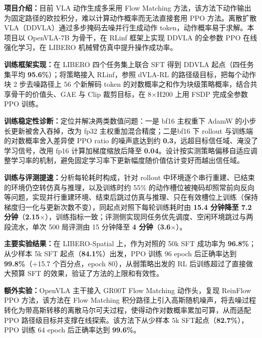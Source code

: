 
\textbf{项目介绍：}目前 VLA 动作生成多采用 Flow Matching 方法，该方法下动作输出为固定路径的欧拉积分，难以计算动作概率而无法直接套用 PPO 方法。离散扩散 VLA（DDVLA）通过多步掩码去噪并行生成动作 token，动作概率易于求解。本项目以 OpenVLA-7B 为骨干，在 RLinf 框架上实现 DDVLA 的全参数 PPO 在线强化学习，在 LIBERO 机械臂仿真中提升操作成功率。\par
\begin{experienceitems}
  \item \textbf{训练框架实现：}在 LIBERO 四个任务集上联合 SFT 得到 DDVLA 起点（四任务集平均 \textbf{95.6\%}）；将策略接入 RLinf，参照 dVLA-RL 的路径级目标，把每个动作块 2 步去噪路径上 56 个新解码 token 的对数概率之和作为块级策略概率，结合共享骨干的价值头、GAE 与 Clip 裁剪目标，在 8$\times$H200 上用 FSDP 完成全参数 PPO 训练。
  \item \textbf{训练稳定性诊断：}定位并解决两类数值问题：一是 bf16 主权重下 AdamW 的小步长更新被舍入吞掉，改为 fp32 主权重加混合精度；二是bf16 下 rollout 与训练端的对数概率舍入差异使 PPO ratio 的噪声底达到约 \textbf{0.3}，远超目标信任域、淹没了学习信号，改用 fp16 计算加梯度缩放后降至 \textbf{0.04}。设计按实测策略偏移自适应调整学习率的机制，避免固定学习率下更新幅度随价值估计变好而越出信任域。
  \item \textbf{训练与评测提速：}分析每轮耗时构成，针对 rollout 中环境逐个串行重建、已结束的环境仍空转仿真与推理，以及训练时约 55\% 的动作槽位被掩码却照常前向反向等问题，实现并行重建环境、结束后跳过仿真与推理、只在有效槽位上训练（保持梯度归一化与更新次数不变），同起点对照下每轮训练耗时由 \textbf{15.4 分钟降至 7.2 分钟}（\textbf{2.15$\times$}），训练指标一致；评测侧实现同任务优先调度、空闲环境跳过与两段流水，单次 500 局评测由 15 分钟降至 \textbf{4 分钟}（\textbf{3.6$\times$}）。
  \item \textbf{主要实验结果：}在 LIBERO-Spatial 上，作为对照的 50k SFT 成功率为 \textbf{96.8\%}；从少样本 5k SFT 起点（\textbf{84.1\%}）出发，PPO 训练 96 epoch 后正确率达到 \textbf{99.8\%}（+15.7 个百分点，epoch 80），从弱策略出发的 RL 后训练超过了直接做大预算 SFT 的效果，验证了方法的上限和有效性。
  \item \textbf{额外实验：}OpenVLA 主干接入 GR00T Flow Matching 动作头，复现 ReinFlow PPO 方法，该方法在 Flow Matching 积分路径上引入高斯随机噪声，将去噪过程转化为带高斯转移的离散马尔可夫过程，使得动作对数概率累加可算，从而适配 PPO 路径级目标并支撑在线探索。该方法下从少样本 5k SFT起点（\textbf{82.7\%}），PPO 训练 64 epoch 后正确率达到 \textbf{99.6\%}。
\end{experienceitems}
